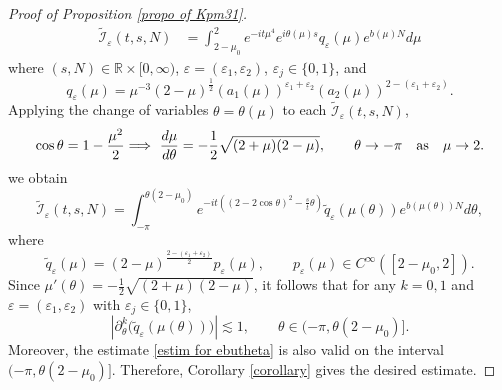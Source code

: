 \documentclass[reqno, 11pt]{amsart}
\newcommand\R{\mathbb{R}}
\newcommand\mcaI{\mathcal{I}}
\numberwithin{equation}{section}
\begin{document}
\begin{proof}[Proof of Proposition \ref{propo of Kpm31}]
\begin{align*}
\widetilde{\mcaI}_{\varepsilon}(t,s,N)&=\int_{2-\mu_0}^{2}e^{-it\mu^4}e^{i\theta(\mu)s}q_{\varepsilon}(\mu)e^{b(\mu)N}d\mu
\end{align*}
where $(s,N)\in \R\times [0,\infty)$, $\varepsilon=(\varepsilon_1,\varepsilon_2)$, $\varepsilon_j\in\{0,1\}$, and 
\begin{equation*}
    q_{\varepsilon}(\mu)=\mu^{-3}(2-\mu)^{\frac{1}{2}}(a_1(\mu))^{\varepsilon_1+\varepsilon_2}(a_2(\mu))^{2-(\varepsilon_1+\varepsilon_2)}.
\end{equation*}
Applying the change of variables $\theta=\theta(\mu)$ to each $\widetilde{\mcaI}_{\varepsilon}(t,s,N)$,
\begin{equation*}
 \cos\theta=1-\frac{\mu^2}{2} \Longrightarrow\  \frac{d\mu}{d\theta}=-\frac{1}{2}\sqrt{(2+\mu)(2-\mu)},\qquad {\theta}\rightarrow-\pi\quad {\rm as}\quad  \mu\rightarrow2.
 \end{equation*}
we obtain 
\begin{equation*}
\widetilde{\mcaI}_{\varepsilon}(t,s,N)=\int_{-\pi}^{\theta(2-\mu_0)}e^{-it((2-2\cos\theta)^2-\frac{s}{t}\theta)}\widetilde{q}_{\varepsilon}(\mu(\theta))e^{b(\mu(\theta))N}d\theta,
\end{equation*}
where 
\begin{equation*}
 \widetilde{q}_{\varepsilon}(\mu)=(2-\mu)^{\frac{2-(\varepsilon_1+\varepsilon_2)}{2}}p_{\varepsilon}(\mu),\qquad p_{\varepsilon}(\mu)\in C^{\infty}([2-\mu_0,2]).
\end{equation*}
Since $\mu'(\theta)=-\frac{1}{2}\sqrt{(2+\mu)(2-\mu)}$, it follows that for any $k=0,1$ and 
 $\varepsilon=(\varepsilon_1,\varepsilon_2)$ with $\varepsilon_j\in\{0,1\}$, 
\begin{equation*}
|\partial^k_{\theta}\big(\widetilde{q}_{\varepsilon}(\mu(\theta))\big)|\lesssim
1 ,\qquad \theta\in(-\pi,\theta(2-\mu_0)].
\end{equation*}
Moreover, the estimate \eqref{estim for ebutheta} is also valid on the interval $(-\pi,\theta(2-\mu_0)]$. Therefore, Corollary \ref{corollary} gives the desired estimate.


\end{proof}
\end{document}
